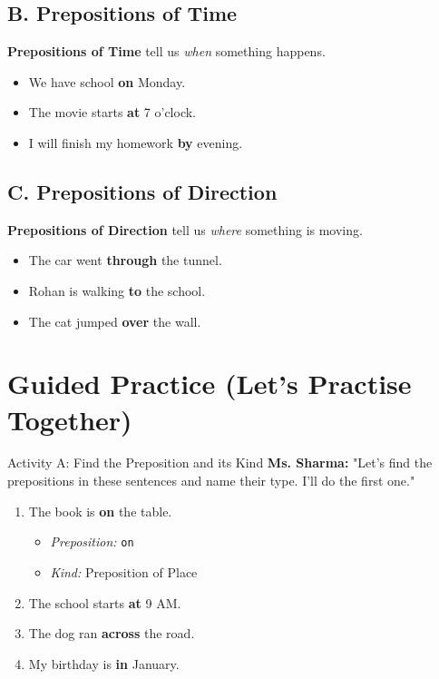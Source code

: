 \subsection*{B. Prepositions of Time}
\textbf{Prepositions of Time} tell us \textit{when} something happens.
\begin{itemize}
    \item We have school \textbf{on} Monday.
    \item The movie starts \textbf{at} 7 o'clock.
    \item I will finish my homework \textbf{by} evening.
\end{itemize}

\subsection*{C. Prepositions of Direction}
\textbf{Prepositions of Direction} tell us \textit{where} something is moving.
\begin{itemize}
    \item The car went \textbf{through} the tunnel.
    \item Rohan is walking \textbf{to} the school.
    \item The cat jumped \textbf{over} the wall.
\end{itemize}

\section{Guided Practice (Let's Practise Together)}
\begin{activitybox}{Activity A: Find the Preposition and its Kind}
\textbf{Ms. Sharma:} "Let's find the prepositions in these sentences and name their type. I'll do the first one."
\begin{enumerate}
    \item The book is \textbf{on} the table.
    \begin{itemize}
        \item \textit{Preposition:} \texttt{on}
        \item \textit{Kind:} Preposition of Place
    \end{itemize}
    \item The school starts \textbf{at} 9 AM.
    \item The dog ran \textbf{across} the road.
    \item My birthday is \textbf{in} January.
\end{enumerate}
\end{activitybox}

